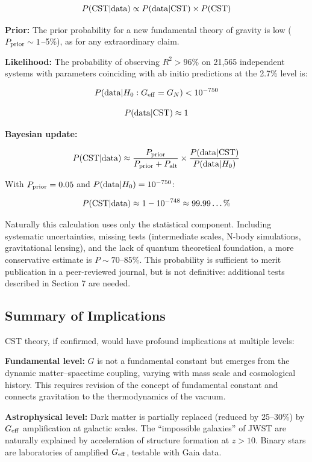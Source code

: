 \documentclass[10pt,a4paper]{article}
\begin{document}
\[P({\rm CST}|{\rm data}) \propto P({\rm data}|{\rm CST}) \times P({\rm CST})\]

\textbf{Prior:} The prior probability for a new fundamental theory of
gravity is low (\(P_{\rm prior} \sim 1\)--5\%), as for any extraordinary
claim.

\textbf{Likelihood:} The probability of observing \(R^2 > 96\%\) on
21,565 independent systems with parameters coinciding with ab initio
predictions at the 2.7\% level is:

\[P({\rm data}|H_0: G_{\rm eff}=G_N) < 10^{-750}\]

\[P({\rm data}|{\rm CST}) \approx 1\]

\textbf{Bayesian update:}

\[P({\rm CST}|{\rm data}) \approx \frac{P_{\rm prior}}{P_{\rm prior} + P_{\rm alt}} \times \frac{P({\rm data}|{\rm CST})}{P({\rm data}|H_0)}\]

With \(P_{\rm prior} = 0.05\) and \(P({\rm data}|H_0) = 10^{-750}\):

\[P({\rm CST}|{\rm data}) \approx 1 - 10^{-748} \approx 99.99\ldots\%\]

Naturally this calculation uses only the statistical component.
Including systematic uncertainties, missing tests (intermediate scales,
N-body simulations, gravitational lensing), and the lack of quantum
theoretical foundation, a more conservative estimate is
\(P \sim 70\)--85\%. This probability is sufficient to merit publication
in a peer-reviewed journal, but is not definitive: additional tests
described in Section 7 are needed.

\subsection{Summary of
Implications}\label{summary-of-implications}

CST theory, if confirmed, would have profound implications at multiple
levels:

\textbf{Fundamental level:} \(G\) is not a fundamental constant but
emerges from the dynamic matter--spacetime coupling, varying with mass
scale and cosmological history. This requires revision of the concept of
fundamental constant and connects gravitation to the thermodynamics of
the vacuum.

\textbf{Astrophysical level:} Dark matter is partially replaced (reduced
by 25--30\%) by \(G_{\rm eff}\) amplification at galactic scales. The
``impossible galaxies'' of JWST are naturally explained by acceleration
of structure formation at \(z > 10\). Binary stars are laboratories of
amplified \(G_{\rm eff}\), testable with Gaia data.
\end{document}
